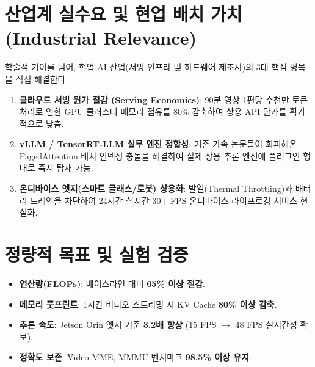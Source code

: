 \documentclass[10pt, a4paper, twocolumn]{article}
\begin{document}
\section{산업계 실수요 및 현업 배치 가치 (Industrial Relevance)}
학술적 기여를 넘어, 현업 AI 산업(서빙 인프라 및 하드웨어 제조사)의 3대 핵심 병목을 직접 해결한다:
\begin{enumerate}
    \item \textbf{클라우드 서빙 원가 절감 (Serving Economics)}: 90분 영상 1편당 수천만 토큰 처리로 인한 GPU 클러스터 메모리 점유를 80\% 감축하여 상용 API 단가를 획기적으로 낮춤.
    \item \textbf{vLLM / TensorRT-LLM 실무 엔진 정합성}: 기존 가속 논문들이 회피해온 PagedAttention 배치 인덱싱 충돌을 해결하여 실제 상용 추론 엔진에 플러그인 형태로 즉시 탑재 가능.
    \item \textbf{온디바이스 엣지(스마트 글래스/로봇) 상용화}: 발열(Thermal Throttling)과 배터리 드레인을 차단하여 24시간 실시간 30+ FPS 온디바이스 라이프로깅 서비스 현실화.
\end{enumerate}

\section{정량적 목표 및 실험 검증}
\begin{itemize}
    \item \textbf{연산량(FLOPs)}: 베이스라인 대비 \textbf{65\% 이상 절감}.
    \item \textbf{메모리 풋프린트}: 1시간 비디오 스트리밍 시 KV Cache \textbf{80\% 이상 감축}.
    \item \textbf{추론 속도}: Jetson Orin 엣지 기준 \textbf{3.2배 향상} (15 FPS $\rightarrow$ 48 FPS 실시간성 확보).
    \item \textbf{정확도 보존}: Video-MME, MMMU 벤치마크 \textbf{98.5\% 이상 유지}.
\end{itemize}
\end{document}
